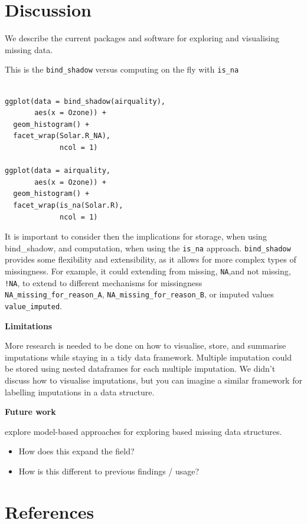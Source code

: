 \documentclass[]{article}
\providecommand{\tightlist}{%
  \setlength{\itemsep}{0pt}\setlength{\parskip}{0pt}}
\begin{document}
\section{Discussion}\label{discussion}

We describe the current packages and software for exploring and
visualising missing data.

This is the \texttt{bind\_shadow} versus computing on the fly with
\texttt{is\_na}

\begin{verbatim}

ggplot(data = bind_shadow(airquality),
       aes(x = Ozone)) + 
  geom_histogram() + 
  facet_wrap(Solar.R_NA),
             ncol = 1)
             
ggplot(data = airquality,
       aes(x = Ozone)) + 
  geom_histogram() + 
  facet_wrap(is_na(Solar.R),
             ncol = 1)
\end{verbatim}

It is important to consider then the implications for storage, when
using bind\_shadow, and computation, when using the \texttt{is\_na}
approach. \texttt{bind\_shadow} provides some flexibility and
extensibility, as it allows for more complex types of missingness. For
example, it could extending from missing, \texttt{NA},and not missing,
\texttt{!NA}, to extend to different mechanisms for missingness
\texttt{NA\_missing\_for\_reason\_A},
\texttt{NA\_missing\_for\_reason\_B}, or imputed values
\texttt{value\_imputed}.

\textbf{Limitations}

More research is needed to be done on how to visualise, store, and
summarise imputations while staying in a tidy data framework. Multiple
imputation could be stored using nested dataframes for each multiple
imputation. We didn't discuss how to visualise imputations, but you can
imagine a similar framework for labelling imputations in a data
structure.

\textbf{Future work}

explore model-based approaches for exploring based missing data
structures.

\begin{itemize}
\tightlist
\item
  How does this expand the field?
\item
  How is this different to previous findings / usage?
\end{itemize}

\section*{References}\label{references}
\end{document}
